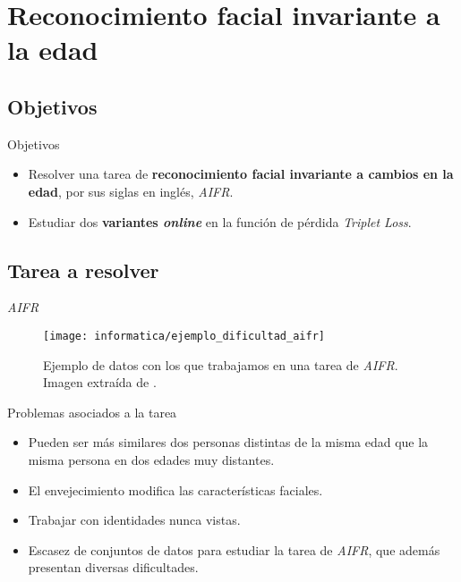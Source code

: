 \section{Reconocimiento facial invariante a la edad}

\subsection{Objetivos}
\begin{frame}{Objetivos}

	\begin{itemize}
		\item Resolver una tarea de \textbf{reconocimiento facial invariante a cambios en la edad}, por sus siglas en inglés, \textit{AIFR}.
		\item Estudiar dos \textbf{variantes \textit{online}} en la función de pérdida \textit{Triplet Loss}.
	\end{itemize}

\end{frame}

\subsection{Tarea a resolver}

\begin{frame}{\textit{AIFR}}

	\begin{figure}
		\texttt{[image: informatica/ejemplo\_dificultad\_aifr]}
		\caption{Ejemplo de datos con los que trabajamos en una tarea de \textit{AIFR}. Imagen extraída de \cite{informatica:aifr_survey}.}
		\label{img:ejemplo_dificultad_aifr}
	\end{figure}

\end{frame}

\begin{frame}{Problemas asociados a la tarea}

	\begin{itemize}
		\item Pueden ser más similares dos personas distintas de la misma edad que la misma persona en dos edades muy distantes.
		\item El envejecimiento modifica las características faciales.
		\item Trabajar con identidades nunca vistas.
		\item Escasez de conjuntos de datos para estudiar la tarea de \textit{AIFR}, que además presentan diversas dificultades.
	\end{itemize}

\end{frame}

